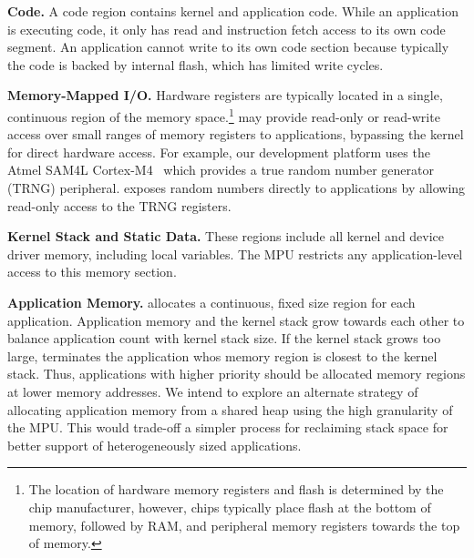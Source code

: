 {\bf Code.}
A code region contains kernel and application code. While an application is
executing code, it only has read and instruction fetch access to its own code
segment. An application cannot write to its own code section because typically
the code is backed by internal flash, which has limited write cycles.

{\bf Memory-Mapped I/O.}
Hardware registers are typically located in a single, continuous region of the
memory space.\footnote{The location of hardware memory registers and flash is
determined by the chip manufacturer, however, chips typically place flash at
the bottom of memory, followed by RAM, and peripheral memory registers towards
the top of memory.} \name may provide read-only or read-write access over small
ranges of memory registers to applications, bypassing the kernel for direct
hardware access. For example, our development platform uses the Atmel SAM4L
Cortex-M4~\cite{sam4l} which provides a true random number generator (TRNG)
peripheral. \name exposes random numbers directly to applications by allowing
read-only access to the TRNG registers.

{\bf Kernel Stack and Static Data.}
These regions include all kernel and device driver memory, including local
variables. The MPU restricts any application-level access to this memory
section.

{\bf Application Memory.}
\name allocates a continuous, fixed size region for each application.
Application memory and the kernel stack grow towards each other to balance
application count with kernel stack size. If the kernel stack grows too large,
\name terminates the application whos memory region is closest to the kernel
stack. Thus, applications with higher priority should be allocated memory
regions at lower memory addresses. We intend to explore an alternate strategy of
allocating application memory from a shared heap using the high granularity of
the MPU.  This would trade-off a simpler process for reclaiming stack space
for better support of heterogeneously sized applications.


